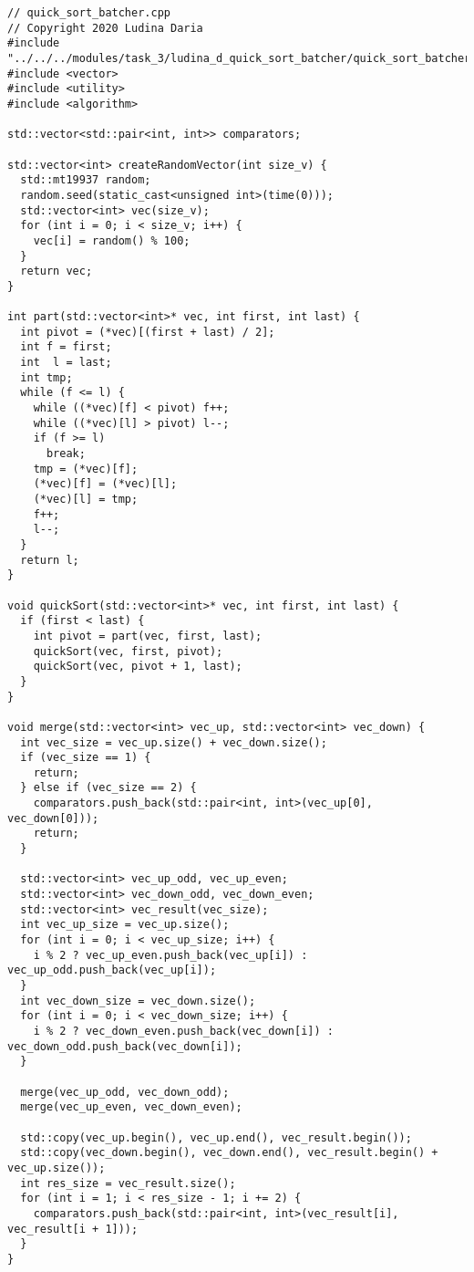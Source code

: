 \documentclass[a4paper]{report}
\begin{document}
\begin{lstlisting}
// quick_sort_batcher.cpp
// Copyright 2020 Ludina Daria
#include "../../../modules/task_3/ludina_d_quick_sort_batcher/quick_sort_batcher.h"
#include <vector>
#include <utility>
#include <algorithm>

std::vector<std::pair<int, int>> comparators;

std::vector<int> createRandomVector(int size_v) {
  std::mt19937 random;
  random.seed(static_cast<unsigned int>(time(0)));
  std::vector<int> vec(size_v);
  for (int i = 0; i < size_v; i++) {
    vec[i] = random() % 100;
  }
  return vec;
}

int part(std::vector<int>* vec, int first, int last) {
  int pivot = (*vec)[(first + last) / 2];
  int f = first;
  int  l = last;
  int tmp;
  while (f <= l) {
    while ((*vec)[f] < pivot) f++;
    while ((*vec)[l] > pivot) l--;
    if (f >= l)
      break;
    tmp = (*vec)[f];
    (*vec)[f] = (*vec)[l];
    (*vec)[l] = tmp;
    f++;
    l--;
  }
  return l;
}

void quickSort(std::vector<int>* vec, int first, int last) {
  if (first < last) {
    int pivot = part(vec, first, last);
    quickSort(vec, first, pivot);
    quickSort(vec, pivot + 1, last);
  }
}

void merge(std::vector<int> vec_up, std::vector<int> vec_down) {
  int vec_size = vec_up.size() + vec_down.size();
  if (vec_size == 1) {
    return;
  } else if (vec_size == 2) {
    comparators.push_back(std::pair<int, int>(vec_up[0], vec_down[0]));
    return;
  }

  std::vector<int> vec_up_odd, vec_up_even;
  std::vector<int> vec_down_odd, vec_down_even;
  std::vector<int> vec_result(vec_size);
  int vec_up_size = vec_up.size();
  for (int i = 0; i < vec_up_size; i++) {
    i % 2 ? vec_up_even.push_back(vec_up[i]) : vec_up_odd.push_back(vec_up[i]);
  }
  int vec_down_size = vec_down.size();
  for (int i = 0; i < vec_down_size; i++) {
    i % 2 ? vec_down_even.push_back(vec_down[i]) : vec_down_odd.push_back(vec_down[i]);
  }

  merge(vec_up_odd, vec_down_odd);
  merge(vec_up_even, vec_down_even);

  std::copy(vec_up.begin(), vec_up.end(), vec_result.begin());
  std::copy(vec_down.begin(), vec_down.end(), vec_result.begin() + vec_up.size());
  int res_size = vec_result.size();
  for (int i = 1; i < res_size - 1; i += 2) {
    comparators.push_back(std::pair<int, int>(vec_result[i], vec_result[i + 1]));
  }
}


\end{lstlisting}
\end{document}
